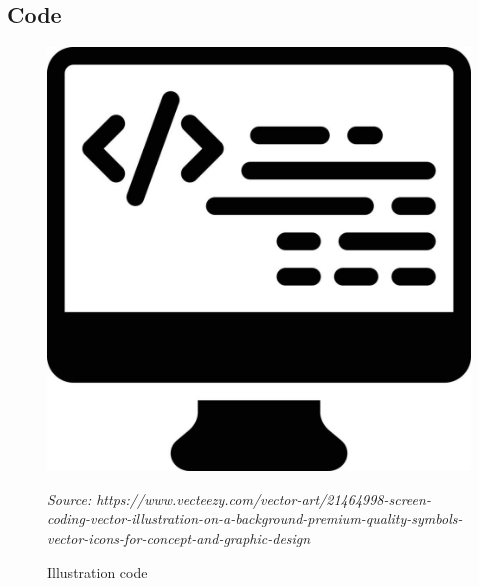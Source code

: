 \documentclass[12pt,a4paper,twoside]{article}
\newcommand{\source}[1]{\vspace{-11pt} \caption*{\small \textit{Source: {#1}} }}
\begin{document}



\subsection{Code}

\begin{figure}[h]
	\centering
	\includegraphics[width=0.5\linewidth]{Figures/Illustration_code}
	\caption{Illustration code}
	\label{fig:illustrationcode}
	\source{https://www.vecteezy.com/vector-art/21464998-screen-coding-vector-illustration-on-a-background-premium-quality-symbols-vector-icons-for-concept-and-graphic-design}
\end{figure}











\end{document}
